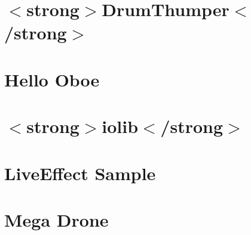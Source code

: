 \let\mypdfximage\pdfximage\def\pdfximage{\immediate\mypdfximage}\documentclass[twoside]{book}
\newcommand{\+}{\discretionary{\mbox{\scriptsize$\hookleftarrow$}}{}{}}
\begin{document}
\chapter{$<$strong$>$Drum\+Thumper$<$/strong$>$}
\label{md__c_1__users_fab_src__github_branches__neural_amp_modeler_plugin_i_plug2__dependencies__build_f814963a1ecb214d02dc632a773ac36f}

\chapter{Hello Oboe}
\label{md__c_1__users_fab_src__github_branches__neural_amp_modeler_plugin_i_plug2__dependencies__build_a303cdf7b8abece5926b9d789d0ca31b}

\chapter{$<$strong$>$iolib$<$/strong$>$}
\label{md__c_1__users_fab_src__github_branches__neural_amp_modeler_plugin_i_plug2__dependencies__build_da67a7e47850783e5c2e89ad06fdb557}

\chapter{Live\+Effect Sample}
\label{md__c_1__users_fab_src__github_branches__neural_amp_modeler_plugin_i_plug2__dependencies__build_eaec8225d2bf27dce96aa21e394a1f2d}

\chapter{Mega Drone}
\label{md__c_1__users_fab_src__github_branches__neural_amp_modeler_plugin_i_plug2__dependencies__build_9b34445b3148ca08a1bd2b971a02eafb}

\end{document}
